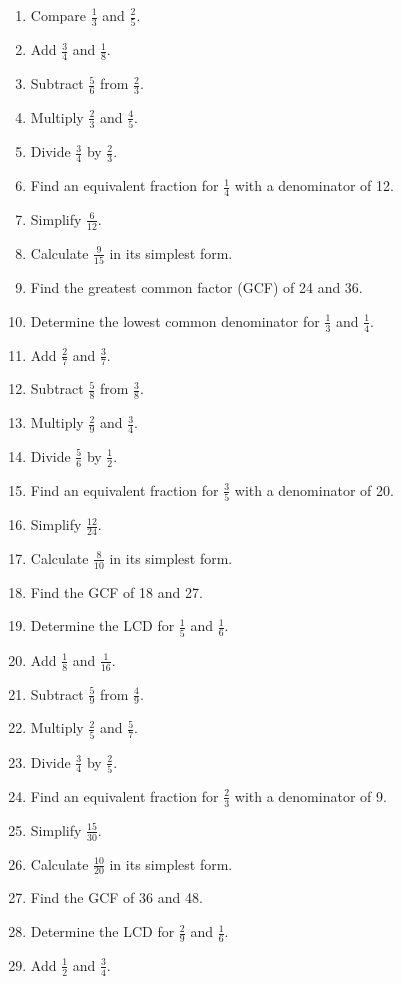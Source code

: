 \documentclass[14pt]{article}
\begin{document}
\begin{enumerate}
\item Compare $\frac{1}{3}$ and $\frac{2}{5}$.
\item Add $\frac{3}{4}$ and $\frac{1}{8}$.
\item Subtract $\frac{5}{6}$ from $\frac{2}{3}$.
\item Multiply $\frac{2}{3}$ and $\frac{4}{5}$.
\item Divide $\frac{3}{4}$ by $\frac{2}{3}$.
\item Find an equivalent fraction for $\frac{1}{4}$ with a denominator of 12.
\item Simplify $\frac{6}{12}$.
\item Calculate $\frac{9}{15}$ in its simplest form.
\item Find the greatest common factor (GCF) of 24 and 36.
\item Determine the lowest common denominator for $\frac{1}{3}$ and $\frac{1}{4}$.
\item Add $\frac{2}{7}$ and $\frac{3}{7}$.
\item Subtract $\frac{5}{8}$ from $\frac{3}{8}$.
\item Multiply $\frac{2}{9}$ and $\frac{3}{4}$.
\item Divide $\frac{5}{6}$ by $\frac{1}{2}$.
\item Find an equivalent fraction for $\frac{3}{5}$ with a denominator of 20.
\item Simplify $\frac{12}{24}$.
\item Calculate $\frac{8}{10}$ in its simplest form.
\item Find the GCF of 18 and 27.
\item Determine the LCD for $\frac{1}{5}$ and $\frac{1}{6}$.
\item Add $\frac{1}{8}$ and $\frac{1}{16}$.
\item Subtract $\frac{5}{9}$ from $\frac{4}{9}$.
\item Multiply $\frac{2}{5}$ and $\frac{5}{7}$.
\item Divide $\frac{3}{4}$ by $\frac{2}{5}$.
\item Find an equivalent fraction for $\frac{2}{3}$ with a denominator of 9.
\item Simplify $\frac{15}{30}$.
\item Calculate $\frac{10}{20}$ in its simplest form.
\item Find the GCF of 36 and 48.
\item Determine the LCD for $\frac{2}{9}$ and $\frac{1}{6}$.
\item Add $\frac{1}{2}$ and $\frac{3}{4}$.

\end{enumerate}
\end{document}

